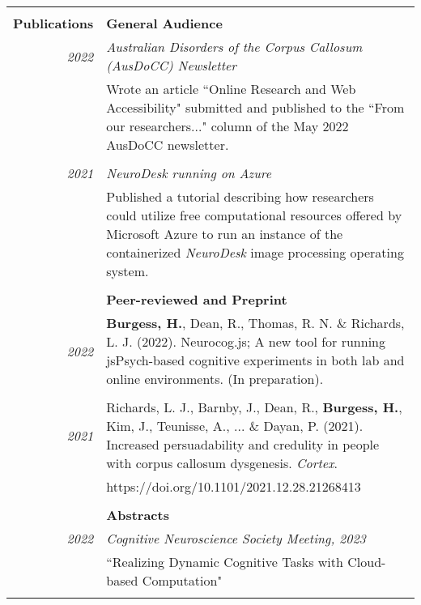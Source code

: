 \documentclass{article}
\begin{document}
\begin{longtable}{r | p{13cm}}
											\pagebreak

											\hline \\
		\large\textbf{Publications}			& \large\textbf{General Audience} \\
		\large\textit{2022}					& \large\textit{Australian Disorders of the Corpus Callosum (AusDoCC) Newsletter} \\
											& Wrote an article ``Online Research and Web Accessibility" submitted and published to the ``From our researchers..." column of the May 2022 AusDoCC newsletter. \\	
											& \\
											
		\large\textit{2021}					& \large\textit{NeuroDesk running on Azure}	\\	
											& Published a tutorial describing how researchers could utilize free computational resources offered by Microsoft Azure to run an instance of the containerized \textit{NeuroDesk} image processing operating system. \\
											& \\
											
											& \large\textbf{Peer-reviewed and Preprint} \\
		\large\textit{2022}					&  \textbf{Burgess, H.}, Dean, R., Thomas, R. N. \& Richards, L. J. (2022). Neurocog.js; A new tool for running jsPsych-based cognitive experiments in both lab and online environments. (In preparation). \\
											& \\

		\large\textit{2021}					& Richards, L. J., Barnby, J., Dean, R., \textbf{Burgess, H.}, Kim, J., Teunisse, A., ... \& Dayan, P. (2021). Increased persuadability and credulity in people with corpus callosum dysgenesis. \textit{Cortex}. \\
											& https://doi.org/10.1101/2021.12.28.21268413 \\
											& \\
											
											& \large\textbf{Abstracts} \\
		\large\textit{2022}					& \large\textit{Cognitive Neuroscience Society Meeting, 2023}\\
											& ``Realizing Dynamic Cognitive Tasks with Cloud-based Computation"  \\
											& \\


\end{longtable}
\end{document}
